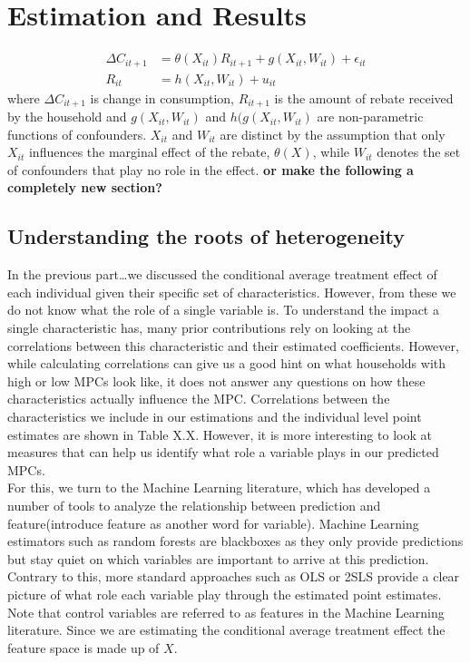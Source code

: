 \section{Estimation and Results} \label{sec:estim_res}
\begin{align}
    \Delta C_{it+1}&=\theta(X_{it})R_{it+1}+g(X_{it}, W_{it})+\epsilon_{it} \label{eq:plm_C1}\\
    R_{it}&=h(X_{it}, W_{it})+u_{it} \label{eq:plm_C2}
\end{align}
where $\Delta C_{it+1}$ is change in consumption, $R_{it+1}$ is the amount of rebate received by the household and $g(X_{it}, W_{it})$ and $h(g(X_{it}, W_{it})$ are non-parametric functions of confounders. $X_{it}$ and $W_{it}$ are distinct by the assumption that only $X_{it}$ influences the marginal effect of the rebate, $\theta(X)$, while $W_{it}$ denotes the set of confounders that play no role in the effect.
\textbf{or make the following a completely new section?}

\subsection{Understanding the roots of heterogeneity} \label{subsec:roots_of_heterogeneity}
In the previous part\dots we discussed the conditional average treatment effect of each individual given their specific set of characteristics. However, from these we do not know what the role of a single variable is. To understand the impact a single characteristic has, many prior contributions rely on looking at the correlations between this characteristic and their estimated coefficients. However, while calculating correlations can give us a good hint on what households with high or low MPCs look like, it does not answer any questions on how these characteristics actually influence the MPC. Correlations between the characteristics we include in our estimations and the individual level point estimates are shown in Table X.X. However, it is more interesting to look at measures that can help us identify what role a variable plays in our predicted MPCs. \\
For this, we turn to the Machine Learning literature, which has developed a number of tools to analyze the relationship between prediction and feature(introduce feature as another word for variable). Machine Learning estimators such as random forests are blackboxes as they only provide predictions but stay quiet on which variables are important to arrive at this prediction. Contrary to this, more standard approaches such as OLS or 2SLS provide a clear picture of what role each variable play through the estimated point estimates. \\
Note that control variables are referred to as features in the Machine Learning literature. Since we are estimating the conditional average treatment effect the feature space is made up of $X$.

